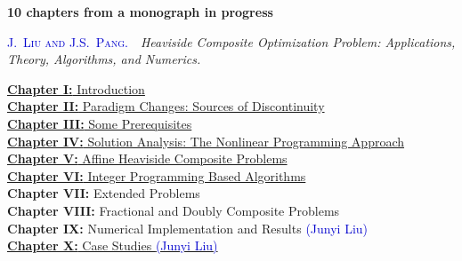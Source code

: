 \documentclass[aspectratio=169,xcolor=dvipsnames]{beamer}
\begin{document}
\begin{frame}
  {\large\textcolor{MediumRed}{\textbf{10 chapters from a monograph in progress}}}

  \vspace{0.10cm}
  {\small\textcolor{MediumBlue}{\textsc{J.~Liu and J.S.~Pang.}}\ \,
    \textit{Heaviside Composite Optimization Problem: Applications, Theory,
    Algorithms, and Numerics.}}

  \vspace{0.16cm}
  \small
  \begin{flushleft}
    \hyperlink{chapter-introduction}{\textbf{Chapter I:} Introduction}\\[3pt]
    \hyperlink{chapter-paradigm}{\textbf{Chapter II:} Paradigm Changes: Sources of Discontinuity}\\[3pt]
    \hyperlink{chapter-prerequisites}{\textbf{Chapter III:} Some Prerequisites}\\[3pt]
    \hyperlink{chapter-solution-analysis}{\textbf{Chapter IV:} Solution Analysis: The Nonlinear Programming Approach}\\[3pt]
    \hyperlink{chapter-affine}{\textbf{Chapter V:} Affine Heaviside Composite Problems}\\[3pt]
    \hyperlink{chapter-ip-algorithms}{\textbf{Chapter VI:} Integer Programming Based Algorithms}\\[3pt]
    \textbf{Chapter VII:} Extended Problems\\[3pt]
    \textbf{Chapter VIII:} Fractional and Doubly Composite Problems\\[3pt]
    \textbf{Chapter IX:} Numerical Implementation and Results
      \textcolor{MediumBlue}{(Junyi Liu)}\\[3pt]
    \hyperlink{chapter-case-studies}{\textbf{Chapter X:} Case Studies \textcolor{MediumBlue}{(Junyi Liu)}}
  \end{flushleft}
\end{frame}
\end{document}
